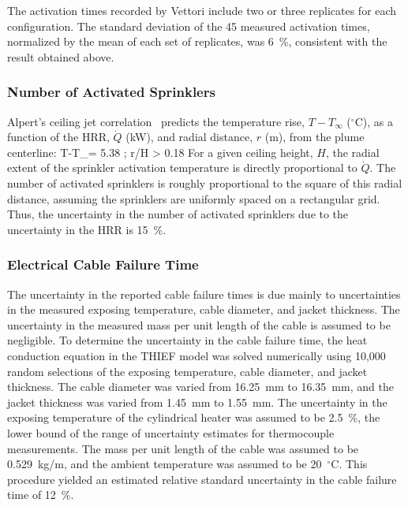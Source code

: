 The activation times recorded by Vettori include two or three replicates for each configuration. The standard deviation of the 45 measured activation times, normalized by the mean of each set of replicates, was 6~\%, consistent with the result obtained above.

\subsubsection{Number of Activated Sprinklers}

Alpert's ceiling jet correlation~\cite{SFPE:Alpert} predicts the temperature rise, $T-T_\infty$ ($^\circ$C), as a function of the HRR, $\dot{Q}$ (kW), and radial distance, $r$ (m), from the plume centerline:
\be
   T-T_\infty = 5.38 \;  \quad ; \quad r/H > 0.18
\ee
For a given ceiling height, $H$, the radial extent of the sprinkler activation temperature is directly proportional to $\dot{Q}$. The number of activated sprinklers is roughly proportional to the square of this radial distance, assuming the sprinklers are uniformly spaced on a rectangular grid. Thus, the uncertainty in the number of activated sprinklers due to the uncertainty in the HRR is 15~\%. 


\subsubsection{Electrical Cable Failure Time}

The uncertainty in the reported cable failure times is due mainly to uncertainties in the measured exposing temperature, cable diameter, and jacket thickness. The uncertainty in the measured mass per unit length of the cable is assumed to be negligible. To determine the uncertainty in the cable failure time, the heat conduction equation in the THIEF model was solved numerically using 10,000 random selections of the exposing temperature, cable diameter, and jacket thickness. The cable diameter was varied from 16.25~mm to 16.35~mm, and the jacket thickness was varied from 1.45~mm to 1.55~mm. The uncertainty in the exposing temperature of the cylindrical heater was assumed to be 2.5~\%, the lower bound of the range of uncertainty estimates for thermocouple measurements. The mass per unit length of the cable was assumed to be 0.529~kg/m, and the ambient temperature was assumed to be 20~$^\circ$C. This procedure yielded an estimated relative standard uncertainty in the cable failure time of 12~\%.


